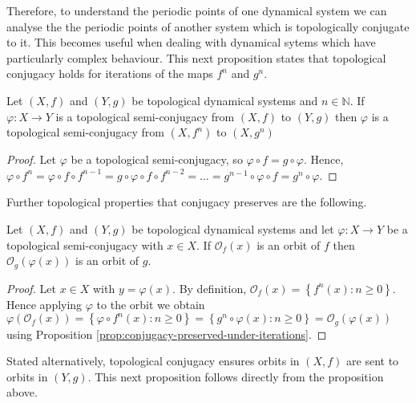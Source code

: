 Therefore, to understand the periodic points of one dynamical system we can analyse the the periodic points of another system which is topologically conjugate to it. This becomes useful when dealing with dynamical sytems which have particularly complex behaviour. This next proposition states that topological conjugacy holds for iterations of the maps $f^n$ and $g^n$.

\begin{prop} \label{prop:conjugacy-preserved-under-iterations}
    Let $(X, f)$ and $(Y, g)$ be topological dynamical systems and $n \in \mathbb{N}$. If $\varphi: X \to Y$ is a topological semi-conjugacy from $(X, f)$ to $(Y, g)$ then $\varphi$ is a topological semi-conjugacy from $(X, f^n)$ to $(X, g^n)$
    \begin{proof}
        Let $\varphi$ be a topological semi-conjugacy, so $\varphi \circ f = g \circ \varphi$. Hence, $\varphi \circ f^n = \varphi \circ f \circ f^{n-1} = g \circ \varphi \circ f \circ f^{n-2} = \dots = g^{n-1} \circ \varphi \circ f = g^n \circ \varphi$.
    \end{proof}
\end{prop}

Further topological properties that conjugacy preserves are the following.

\begin{prop} \label{prop:conjugacy-preserves-orbits}
    Let $(X, f)$ and $(Y, g)$ be topological dynamical systems and let $\varphi: X \to Y$ be a topological semi-conjugacy with $x \in X$. If $\mathcal{O}_f(x)$ is an orbit of $f$ then $\mathcal{O}_g(\varphi(x))$ is an orbit of $g$.
    \begin{proof}
        Let $x \in X$ with $y = \varphi(x)$. By definition, $\mathcal{O}_f(x) = \left\lbrace f^n(x) : n \geq 0 \right\rbrace$. Hence applying $\varphi$ to the orbit we obtain $\varphi\left(\mathcal{O}_f(x)\right) = \left\lbrace \varphi \circ f^n(x) : n \geq 0 \right\rbrace = \left\lbrace g^n \circ \varphi(x) : n \geq 0 \right\rbrace = \mathcal{O}_g(\varphi(x))$ using Proposition \ref{prop:conjugacy-preserved-under-iterations}.
    \end{proof}
\end{prop}

Stated alternatively, topological conjugacy ensures orbits in $(X, f)$ are sent to orbits in $(Y, g)$. This next proposition follows directly from the proposition above.

